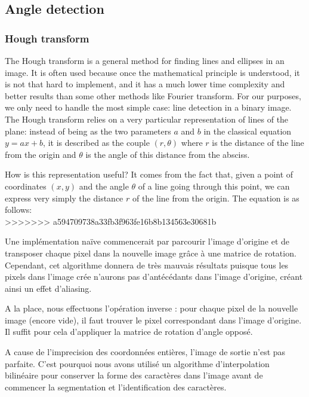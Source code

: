 \subsection{Angle detection}

\subsubsection{Hough transform}

The Hough transform is a general method for finding lines and ellipses in an
image. It is often used because once the mathematical principle is understood,
it is not that hard to implement, and it has a much lower time complexity and
better results than some other methods like Fourier transform. For our purposes,
we only need to handle the most simple case: line detection in a binary image.\\

The Hough transform relies on a very particular representation of lines of the
plane: instead of being as the two parameters $a$ and $b$ in the classical
equation $y = ax + b$, it is described as the couple $(r, \theta)$ where $r$ is
the distance of the line from the origin and $\theta$ is the angle of this
distance from the absciss.\\

\begin{center}
\end{center}

How is this representation useful? It comes from the fact that, given a point
of coordinates $(x, y)$ and the angle $\theta$ of a line going through this
point, we can express very simply the distance $r$ of the line from the origin.
The equation is as follows:\\
>>>>>>> a594709738a33fb3f963fe16b8b134563e30681b

Une implémentation naïve commencerait par parcourir l'image d'origine et de transposer chaque pixel dans la nouvelle image grâce à une matrice de rotation. Cependant, cet algorithme donnera de très mauvais résultats puisque tous les pixels dans l'image crée n'aurons pas d'antécédants dans l'image d'origine, créant ainsi un effet d'aliasing.

A la place, nous effectuons l'opération inverse : pour chaque pixel de la nouvelle image (encore vide), il faut trouver le pixel correspondant dans l'image d'origine. Il suffit pour cela d'appliquer la matrice de rotation d'angle opposé.

A cause de l'imprecision des coordonnées entières, l'image de sortie n'est pas parfaite. C'est pourquoi nous avons utilisé un algorithme d'interpolation bilinéaire pour conserver la forme des caractères dans l'image avant de commencer la segmentation et l'identification des caractères.

